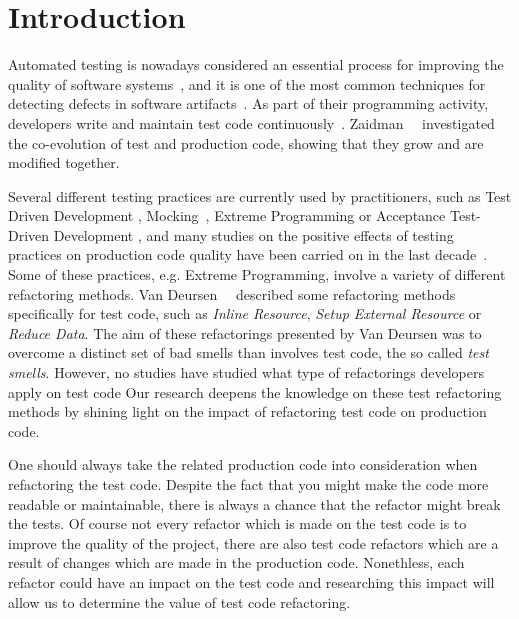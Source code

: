 
\section{Introduction}
Automated testing is nowadays considered an essential process for 
improving the quality of software systems~\cite{Bertolino2007,Myers2004}, and it is
one of the most common techniques for detecting defects in 
software artifacts~\cite{laitenberger1998studying,van2001refactoring}.
As part of their programming activity, developers write and maintain test code 
continuously~\cite{van2001refactoring}. Zaidman~\etal~\cite{Zaidman2008} investigated the
co-evolution of test and production code, showing that they grow and are modified together.

Several different testing
practices are currently used by practitioners, such as Test Driven Development
\cite{erdogmus2010test}, Mocking~\cite{Spadini}, Extreme Programming \cite{lindstrom2004extreme} or
Acceptance Test-Driven Development \cite{aggarwal2014acceptance}, and many studies on the 
positive effects of testing practices on production code quality have
been carried on in the last decade~\cite{laitenberger1998studying,binder1996testing}. 
Some of these practices,
e.g. Extreme Programming, involve a variety of different refactoring methods.
Van Deursen~\etal~\cite{van2001refactoring} described some refactoring methods 
specifically for test code, such as \textit{Inline Resource}, \textit{Setup External Resource}
or \textit{Reduce Data}. The aim of these refactorings presented by Van Deursen was
to overcome a distinct set of bad smells than involves test code, the so called \textit{test smells}.
However, no studies have studied what type of refactorings developers apply on test
code
Our research deepens the knowledge on these test
refactoring methods by shining light on the impact of refactoring test code on
production code.

One should always take the related production code into consideration when
refactoring the test code. Despite the fact that you might make the code more
readable or maintainable, there is always a chance that the refactor might break
the tests. Of course not every refactor which is made on the test code is to
improve the quality of the project, there are also test code refactors which are
a result of changes which are made in the production code. Nonethless, each
refactor could have an impact on the test code and researching this impact will
allow us to determine the value of test code refactoring.

